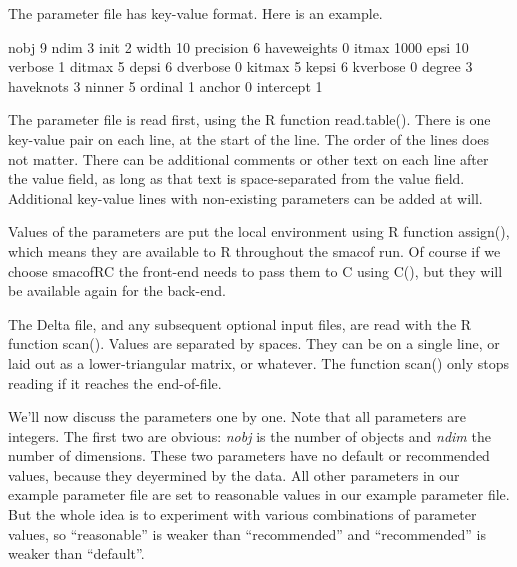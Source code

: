 \documentclass[
  12pt,
]{article}
\newenvironment{Shaded}{\begin{snugshade}}{\end{snugshade}}
\newcommand{\DecValTok}[1]{\textcolor[rgb]{0.00,0.00,0.81}{#1}}
\newcommand{\NormalTok}[1]{#1}
\begin{document}
The parameter file has key-value format. Here is an example.

\begin{Shaded}
\begin{Highlighting}[]
\NormalTok{nobj   }\DecValTok{9}
\NormalTok{ndim   }\DecValTok{3}
\NormalTok{init   }\DecValTok{2}
\NormalTok{width   }\DecValTok{10}
\NormalTok{precision   }\DecValTok{6}
\NormalTok{haveweights   }\DecValTok{0}
\NormalTok{itmax  }\DecValTok{1000}
\NormalTok{epsi  }\DecValTok{10}
\NormalTok{verbose  }\DecValTok{1}
\NormalTok{ditmax  }\DecValTok{5}
\NormalTok{depsi  }\DecValTok{6}
\NormalTok{dverbose  }\DecValTok{0}
\NormalTok{kitmax  }\DecValTok{5}
\NormalTok{kepsi  }\DecValTok{6}
\NormalTok{kverbose  }\DecValTok{0}
\NormalTok{degree  }\DecValTok{3}
\NormalTok{haveknots  }\DecValTok{3}
\NormalTok{ninner  }\DecValTok{5}
\NormalTok{ordinal  }\DecValTok{1}
\NormalTok{anchor }\DecValTok{0}
\NormalTok{intercept  }\DecValTok{1}
\end{Highlighting}
\end{Shaded}

The parameter file is read first, using the R function read.table().
There is one key-value pair on each line, at the start of the line. The order of the lines does not matter. There can be additional comments or other text on
each line after the value field, as long as that text is space-separated
from the value field. Additional key-value lines with non-existing
parameters can be added at will.

Values of the parameters are put the local environment using R function
assign(), which means they are available to R throughout the smacof run.
Of course if we choose smacofRC the front-end needs to pass them to C
using C(), but they will be available again for the back-end.

The Delta file, and any subsequent optional input files, are read with
the R function scan(). Values are separated by spaces. They can be on a
single line, or laid out as a lower-triangular matrix, or whatever. The
function scan() only stops reading if it reaches the end-of-file.

We'll now discuss the parameters one by one. Note that all parameters
are integers. The first two are obvious: \emph{nobj} is the number of objects
and \emph{ndim} the number of dimensions. These two parameters have no
default or recommended values, because they deyermined by the data. All
other parameters in our example parameter file are set to reasonable
values in our example parameter file. But the whole idea is to
experiment with various combinations of parameter values, so
``reasonable'' is weaker than ``recommended'' and ``recommended'' is weaker
than ``default''.
\end{document}
